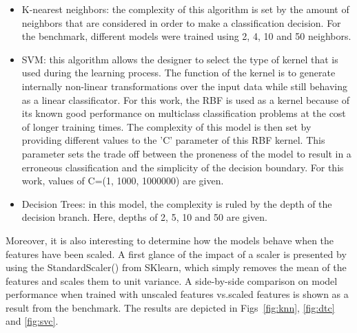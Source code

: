 \begin{itemize}
    \item K-nearest neighbors: the complexity of this algorithm is set by the amount of neighbors that are considered in order to make a classification decision. For the benchmark, different models were trained using 2, 4, 10 and 50 neighbors.
    \item \ac{SVM}: this algorithm allows the designer to select the type of kernel that is used during the learning process. The function of the kernel is to generate internally non-linear transformations over the input data while still behaving as a linear classificator. For this work, the \ac{RBF} is used as a kernel because of its known good performance on multiclass classification problems at the cost of longer training times. The complexity of this model is then set by providing different values to the 'C' parameter of this \ac{RBF} kernel. This parameter sets the trade off between the proneness of the model to result in a erroneous classification and the simplicity of the decision boundary. For this work, values of C=(1, 1000, 1000000) are given.
    \item Decision Trees: in this model, the complexity is ruled by the depth of the decision branch. Here, depths of 2, 5, 10 and 50 are given.
\end{itemize}

Moreover, it is also interesting to determine how the models behave when the features have been scaled. A first glance of the impact of a scaler is presented by using the StandardScaler() from SKlearn, which simply removes the mean of the features and scales them to unit variance. A side-by-side comparison on model performance when trained with unscaled features vs.scaled features is shown as a result from the benchmark. The results are depicted in Figs~\ref{fig:knn}, \ref{fig:dtc} and \ref{fig:svc}.

